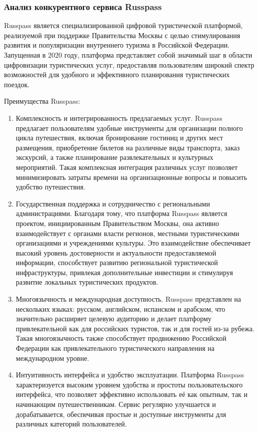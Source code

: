 \subsubsection*{Анализ конкурентного сервиса Russpass}
Russpass является специализированной цифровой туристической платформой, реализуемой при поддержке Правительства Москвы с целью стимулирования развития и популяризации внутреннего туризма в Российской Федерации. Запущенная в 2020 году, платформа представляет собой значимый шаг в области цифровизации туристических услуг, предоставляя пользователям широкий спектр возможностей для удобного и эффективного планирования туристических поездок.

Преимущества Russpass:
\begin{enumerate}
    \item Комплексность и интегрированность предлагаемых услуг. Russpass предлагает пользователям удобные инструменты для организации полного цикла путешествия, включая бронирование гостиниц и других мест размещения, приобретение билетов на различные виды транспорта, заказ экскурсий, а также планирование развлекательных и культурных мероприятий. Такая комплексная интеграция различных услуг позволяет минимизировать затраты времени на организационные вопросы и повысить удобство путешествия.
    \item Государственная поддержка и сотрудничество с региональными администрациями. Благодаря тому, что платформа Russpass является проектом, инициированным Правительством Москвы, она активно взаимодействует с органами власти регионов, местными туристическими организациями и учреждениями культуры. Это взаимодействие обеспечивает высокий уровень достоверности и актуальности предоставляемой информации, способствует развитию региональной туристической инфраструктуры, привлекая дополнительные инвестиции и стимулируя развитие локальных туристических продуктов.
    \item Многоязычность и международная доступность. Russpass представлен на нескольких языках: русском, английском, испанском и арабском, что значительно расширяет целевую аудиторию и делает платформу привлекательной как для российских туристов, так и для гостей из-за рубежа. Такая многоязычность также способствует продвижению Российской Федерации как привлекательного туристического направления на международном уровне.
    \item Интуитивность интерфейса и удобство эксплуатации. Платформа Russpass характеризуется высоким уровнем удобства и простоты пользовательского интерфейса, что позволяет эффективно использовать её как опытным, так и начинающим путешественникам. Сервис регулярно улучшается и дорабатывается, обеспечивая простые и доступные инструменты для различных категорий пользователей.
\end{enumerate}

